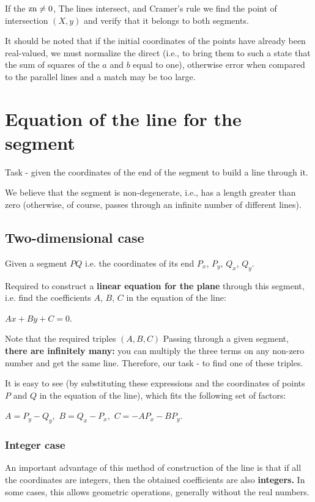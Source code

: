 If the ${\rm zn} \ne 0$, The lines intersect, and Cramer's rule we find the point of intersection $(X, y)$ and verify that it belongs to both segments.

It should be noted that if the initial coordinates of the points have already been real-valued, we must normalize the direct (i.e., to bring them to such a state that the sum of squares of the $a$ and $b$ equal to one), otherwise error when compared to the parallel lines and a match may be too large.

\section{ Equation of the line for the segment }
Task - given the coordinates of the end of the segment to build a line through it.

We believe that the segment is non-degenerate, i.e., has a length greater than zero (otherwise, of course, passes through an infinite number of different lines).

\subsection{ Two-dimensional case }

Given a segment $PQ$ i.e. the coordinates of its end $P_x$, $P_y$, $Q_x$, $Q_y$.

Required to construct a \textbf{linear equation for the plane} through this segment, i.e. find the coefficients $A$, $B$, $C$ in the equation of the line:

$A x + B y + C = 0.$

Note that the required triples $(A, B, C)$ Passing through a given segment, \textbf{there are infinitely many:} you can multiply the three terms on any non-zero number and get the same line. Therefore, our task - to find one of these triples.

It is easy to see (by substituting these expressions and the coordinates of points $P$ and $Q$ in the equation of the line), which fits the following set of factors:

$A = P_y - Q_y,$
$B = Q_x - P_x,$
$C = - A P_x - B P_y.$

\subsubsection{ Integer case }

An important advantage of this method of construction of the line is that if all the coordinates are integers, then the obtained coefficients are also \textbf{integers.} In some cases, this allows geometric operations, generally without the real numbers.

